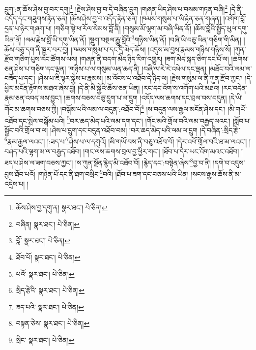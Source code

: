 དྲུག་:ན་ཆོས་ཤེས་བྱ་བར་དགུ།\footnote{ཆོས་ཤེས་བྱ་དགུ་ན།  སྣར་ཐང་།  པེ་ཅིན། } །རྗེས་ཤེས་བྱ་བ་དེ་བཞིན་དྲུག །གཞན་ཡིད་ཤེས་པ་བསམ་གཏན་བཞི།\footnote{བཞིན།  སྣར་ཐང་།  པེ་ཅིན། } །དེ་ནི་འདོད་དང་གཟུགས་རྟེན་ཅན། །ཆོས་ཤེས་བྱ་བ་འདོད་རྟེན་ཅན། །ཁམས་གསུམ་པ་ཡི་རྟེན་ཅན་གཞན། །འགོག་བློ་དྲན་པ་ཉེར་གཞག་པ། །གཅིག་སྟེ་ཕ་རོལ་སེམས་བློ་ནི། །གསུམ་མོ་ལྷག་མ་བཞི་ཡིན་ནོ། །ཆོས་བློའི་སྤྱོད་ཡུལ་དགུ་ཡིན་ནོ། །ལམ་རྗེས་བློ་ཡི་དགུ་ཡིན་ནོ། །སྡུག་བསྔལ་རྒྱུ་བློའི་\footnote{བློ་  སྣར་ཐང་།  པེ་ཅིན། }གཉིས་ཡིན་ནོ། །བཞི་ཡི་བཅུ་ཡིན་གཅིག་གི་མིན། །ཆོས་བཅུ་དག་ནི་སྦྱར་བར་བྱ། །ཁམས་གསུམ་པ་དང་དྲི་མེད་ཆོས། །འདུས་མ་བྱས་རྣམས་གཉིས་གཉིས་སོ། །ཀུན་རྫོབ་གཅིག་པུས་རང་ཚོགས་ལས། །གཞན་ནི་བདག་མེད་ཉིད་རིག་འགྱུར། །ཟག་མེད་སྐད་ཅིག་དང་པོ་ལ། །ཆགས་ཅན་ཤེས་པ་གཅིག་དང་ལྡན། །གཉིས་པ་ལ་གསུམ་ཡན་ཆད་ནི། །བཞི་ལ་རེ་རེ་འཕེལ་དང་ལྡན། །མཐོང་བའི་ལམ་ལ་བཟོད་པ་དང་། །ཤེས་པ་ཇི་ལྟར་སྐྱེས་པ་རྣམས། །མ་འོངས་པ་འཐོབ་དེ་ཉིད་ལ། །རྗེས་གསུམ་ལ་ནི་ཀུན་རྫོབ་ཀྱང་། །དེ་ཕྱིར་མངོན་རྟོགས་མཐའ་ཞེས་བྱ། །དེ་ནི་མི་སྐྱེའི་ཆོས་ཅན་ཡིན། །རང་དང་འོག་ས་འགོག་པའི་མཐའ། །རང་བདེན་རྣམ་ཅན་འབད་ལས་བྱུང་། །ཆགས་བཅས་བཅུ་དྲུག་པ་ལ་དྲུག །འདོད་ལས་ཆགས་དང་བྲལ་བས་བདུན། །དེ་ཡི་གོང་མ་ཆགས་བཅས་ཀྱི། །བསྒོམ་པའི་ལམ་ལ་བདུན་:འཐོབ་བོ།\footnote{ཐོབ་པོ།  སྣར་ཐང་།  པེ་ཅིན། } །ས་བདུན་ལས་རྒྱལ་མངོན་ཤེས་དང་། །མི་གཡོ་འཐོབ་དང་སྤེལ་བསྒོམ་པའི། \footnote{པའོ་  སྣར་ཐང་།  པེ་ཅིན། }བར་ཆད་མེད་པའི་ལམ་དག་དང་། །གོང་མའི་གྲོལ་བའི་ལམ་བརྒྱད་ལའང་། །སློབ་པ་སྦྱོང་བའི་གྲོལ་བ་ལ། །ཤེས་པ་དྲུག་དང་བདུན་འཐོབ་བམ། །བར་ཆད་མེད་པའི་ལམ་ལ་དྲུག །དེ་བཞིན་:སྲིད་རྩེ་\footnote{སྲིད་རྩེའི་  སྣར་ཐང་།  པེ་ཅིན། }རྣམ་རྒྱལ་ལའང་། །:ཟད་པ་\footnote{ཟད་པའི་  སྣར་ཐང་།  པེ་ཅིན། }ཤེས་པ་ལ་དགུའོ། །མི་གཡོ་བས་ནི་བཅུ་འཐོབ་བོ། །དེར་འཕོ་གྲོལ་བའི་ཐ་མ་ལའང་། །བཤད་པའི་ལྷག་མ་ལ་བརྒྱད་འཐོབ། །གང་ལས་ཆགས་བྲལ་བྱ་ཕྱིར་གང་། །ཐོབ་པ་དེར་ཡང་འོག་མའང་འཐོབ། །ཟད་པ་ཤེས་ལ་ཟག་བཅས་ཀྱང་། །ས་ཀུན་སྔོན་རྙེད་མི་འཐོབ་བོ། །རྙེད་དང་:བསྟེན་ཞེས་\footnote{བསྟན་ཅེས་  སྣར་ཐང་།  པེ་ཅིན། }བྱ་བ་ནི། །དགེ་བ་འདུས་བྱས་ཐོབ་པའོ། །གཉེན་པོ་དང་ནི་ཐག་བསྲིང་\footnote{སྲིང་  སྣར་ཐང་།  པེ་ཅིན། }བའི། །ཐོབ་པ་ཟག་དང་བཅས་པའི་ཡིན། །སངས་རྒྱས་ཆོས་ནི་མ་འདྲེས་པ། །
